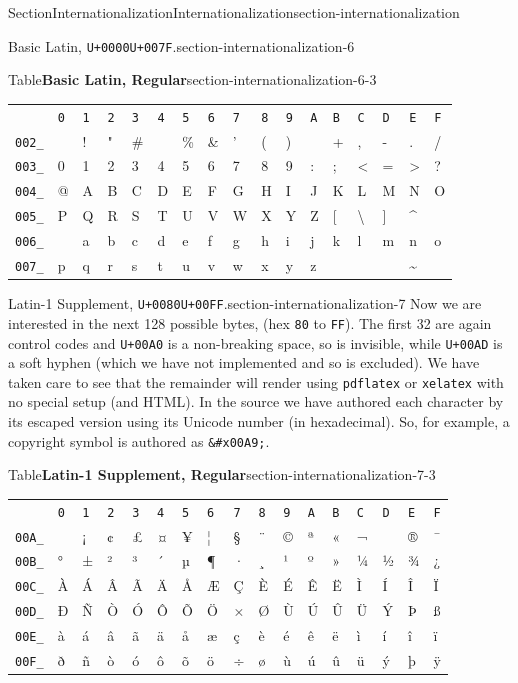 \documentclass[twoside,10pt,]{article}
\newcommand{\tabularfont}{\relax}
\newcommand{\mono}[1]{\texttt{#1}}
\numberwithin{equation}{section}
\begin{document}
\begin{sectionptx}{Section}{Internationalization}{}{Internationalization}{}{}{section-internationalization}
\begin{paragraphs}{Basic Latin, \mono{U+0000}\textendash{}\mono{U+007F}.}{section-internationalization-6}
\begin{tableptx}{Table}{\textbf{Basic Latin, Regular}}{section-internationalization-6-3}{}%
\centering%
{\tabularfont%
\begin{tabular}{lllllllllllllllll}
&\mono{0}&\mono{1}&\mono{2}&\mono{3}&\mono{4}&\mono{5}&\mono{6}&\mono{7}&\mono{8}&\mono{9}&\mono{A}&\mono{B}&\mono{C}&\mono{D}&\mono{E}&\mono{F}\tabularnewline[0pt]
\mono{002\_}&&!&"&\#&\textdollar{}&\%&\&&'&(&)&\textasteriskcentered{}&+&,&-&.&\slash{}\tabularnewline[0pt]
\mono{003\_}&0&1&2&3&4&5&6&7&8&9&:&;&\textless{}&=&\textgreater{}&?\tabularnewline[0pt]
\mono{004\_}&@&A&B&C&D&E&F&G&H&I&J&K&L&M&N&O\tabularnewline[0pt]
\mono{005\_}&P&Q&R&S&T&U&V&W&X&Y&Z&[&\textbackslash{}&]&\textasciicircum{}&\textunderscore{}\tabularnewline[0pt]
\mono{006\_}&\textasciigrave{}&a&b&c&d&e&f&g&h&i&j&k&l&m&n&o\tabularnewline[0pt]
\mono{007\_}&p&q&r&s&t&u&v&w&x&y&z&\textbraceleft{}&\textbar{}&\textbraceright{}&\textasciitilde{}&
\end{tabular}
}%
\end{tableptx}%
\end{paragraphs}%
\begin{paragraphs}{Latin-1 Supplement, \mono{U+0080}\textendash{}\mono{U+00FF}.}{section-internationalization-7}%
Now we are interested in the next 128 possible bytes,  (hex \mono{80} to \mono{FF}).  The first 32 are again control codes and \mono{U+00A0} is a non-breaking space, so is invisible, while \mono{U+00AD} is a soft hyphen (which we have not implemented and so is excluded).  We have taken care to see that the remainder will render using \mono{pdflatex} or \mono{xelatex} with no special setup (and HTML).  In the source we have authored each character by its escaped version using its Unicode number (in hexadecimal).  So, for example, a copyright symbol is authored as \mono{\&\#x00A9;}.%
\begin{tableptx}{Table}{\textbf{Latin-1 Supplement, Regular}}{section-internationalization-7-3}{}%
\centering%
{\tabularfont%
\begin{tabular}{lllllllllllllllll}
&\mono{0}&\mono{1}&\mono{2}&\mono{3}&\mono{4}&\mono{5}&\mono{6}&\mono{7}&\mono{8}&\mono{9}&\mono{A}&\mono{B}&\mono{C}&\mono{D}&\mono{E}&\mono{F}\tabularnewline[0pt]
\mono{00A\_}& &¡&¢&£&¤&¥&¦&§&¨&©&ª&«&¬&&®&¯\tabularnewline[0pt]
\mono{00B\_}&°&±&²&³&´&µ&¶&·&¸&¹&º&»&¼&½&¾&¿\tabularnewline[0pt]
\mono{00C\_}&À&Á&Â&Ã&Ä&Å&Æ&Ç&È&É&Ê&Ë&Ì&Í&Î&Ï\tabularnewline[0pt]
\mono{00D\_}&Ð&Ñ&Ò&Ó&Ô&Õ&Ö&×&Ø&Ù&Ú&Û&Ü&Ý&Þ&ß\tabularnewline[0pt]
\mono{00E\_}&à&á&â&ã&ä&å&æ&ç&è&é&ê&ë&ì&í&î&ï\tabularnewline[0pt]
\mono{00F\_}&ð&ñ&ò&ó&ô&õ&ö&÷&ø&ù&ú&û&ü&ý&þ&ÿ

\end{tabular}}
\end{tableptx}
\end{paragraphs}
\end{sectionptx}
\end{document}
